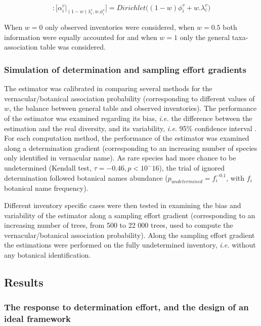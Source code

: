 \documentclass[
  11pt,
  french,
  A4paper,
  extrafontsizes,onecolumn,openright
  ]{memoir}
\begin{document}
\begin{equation}
[\alpha_i^v]: 
\Big[\alpha_i^v | _{(1-w)\lambda_i^v ,w.\phi_i^v}\Big] =Dirichlet\Big((1-w)\phi_i^v+w.\lambda_i^v\Big)
\label{eq:weighting}
\end{equation}

When \(w=0\) only observed inventories were considered, when \(w=0.5\)
both information were equally accounted for and when \(w=1\) only the
general taxa-association table was considered.

\subsubsection{Simulation of determination and sampling effort
gradients}\label{simulation-of-determination-and-sampling-effort-gradients}

The estimator was calibrated in comparing several methods for the
vernacular/botanical association probability (corresponding to different
values of \(w\), the balance between general table and observed
inventories). The performance of the estimator was examined regarding
its bias, \emph{i.e.} the difference between the estimation and the real
diversity, and its variability, \emph{i.e.} 95\% confidence interval
\autocite{Baltanas2009}. For each computation method, the performance of
the estimator was examined along a determination gradient (corresponding
to an increasing number of species only identified in vernacular name).
As rare species had more chance to be undetermined (Kendall test,
\(\tau = -0.46, p < 10^-16\)), the trial of ignored determination
followed botanical names abundance (\(p_{undetermined}=f_i^{-0.1}\),
with \(f_i\) botanical name frequency).

Different inventory specific cases were then tested in examining the
bias and variability of the estimator along a sampling effort gradient
(corresponding to an increasing number of trees, from 500 to 22 000
trees, used to compute the vernacular/botanical association
probability). Along the sampling effort gradient the estimations were
performed on the fully undetermined inventory, \emph{i.e.} without any
botanical identification.

\subsection{Results}\label{results}

\subsubsection{The response to determination effort, and the design of
an ideal
framework}\label{the-response-to-determination-effort-and-the-design-of-an-ideal-framework}
\end{document}
